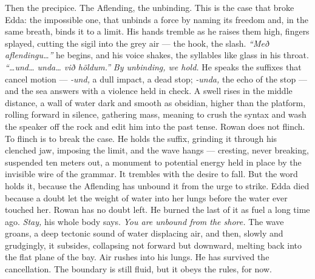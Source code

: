 \documentclass[11pt,oneside]{book}
\newcommand{\sceneline}{%
  \par\vspace{1.2em}
  \begin{center}
    \fontsize{11}{11}\selectfont \textbullet\quad\textbullet\quad\textbullet
  \end{center}
  \vspace{0.6em}\noindent\ignorespaces
}
\begin{document}
Then the precipice. The Aflending, the unbinding. This is the case that
broke Edda: the impossible one, that unbinds a force by naming its
freedom and, in the same breath, binds it to a limit. His hands tremble
as he raises them high, fingers splayed, cutting the sigil into the grey
air --- the hook, the slash. \emph{``Með aflendingu\ldots{}''} he
begins, and his voice shakes, the syllables like glass in his throat.
\emph{``\ldots und\ldots{} unda\ldots{} við höldum.''} \emph{By
unbinding, we hold.} He speaks the suffixes that cancel motion ---
\emph{-und,} a dull impact, a dead stop; \emph{-unda,} the echo of the
stop --- and the sea answers with a violence held in check. A swell
rises in the middle distance, a wall of water dark and smooth as
obsidian, higher than the platform, rolling forward in silence,
gathering mass, meaning to crush the syntax and wash the speaker off the
rock and edit him into the past tense. Rowan does not flinch. To flinch
is to break the case. He holds the suffix, grinding it through his
clenched jaw, imposing the limit, and the wave hangs --- cresting, never
breaking, suspended ten meters out, a monument to potential energy held
in place by the invisible wire of the grammar. It trembles with the
desire to fall. But the word holds it, because the Aflending has unbound
it from the urge to strike. Edda died because a doubt let the weight of
water into her lungs before the water ever touched her. Rowan has no
doubt left. He burned the last of it as fuel a long time ago.
\emph{Stay,} his whole body says. \emph{You are unbound from the shore.}
The wave groans, a deep tectonic sound of water displacing air, and
then, slowly and grudgingly, it subsides, collapsing not forward but
downward, melting back into the flat plane of the bay. Air rushes into
his lungs. He has survived the cancellation. The boundary is still
fluid, but it obeys the rules, for now.

\sceneline
\end{document}
